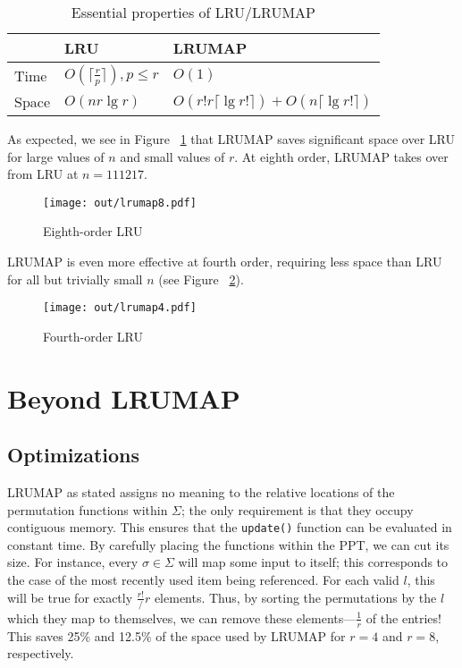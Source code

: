 \documentclass[10pt]{sigplanconf}
\begin{document}
\begin{table}[h]
\begin{center}
	\begin{tabular}{|l|l|l|}
	\hline
	& LRU & LRUMAP \\
	\hline
	Time & $O(\lceil\frac{r}{p}\rceil), {p}\le{r}$ & $O(1)$ \\
	\hline
	Space & $O(nr\lg{r})$ & $O(r!r\lceil\lg{r!}\rceil) + O(n\lceil\lg{r!}\rceil)$ \\
	\hline
	\end{tabular}
	\caption{Essential properties of LRU/LRUMAP}
\label{tab:lru}
\end{center}
\end{table}

As expected, we see in Figure ~\ref{fig:lru8} that LRUMAP saves significant space over LRU for large
values of $n$ and small values of $r$. At eighth order, LRUMAP takes over
from LRU at $n=111217$.

\begin{figure}[h]
\begin{center}
	\texttt{[image: out/lrumap8.pdf]}
	\caption{Eighth-order LRU}
\label{fig:lru8}
\end{center}
\end{figure}

LRUMAP is even more effective at fourth order, requiring less space than LRU
for all but trivially small $n$ (see Figure ~\ref{fig:lru4}).

\begin{figure}[h]
\begin{center}
	\texttt{[image: out/lrumap4.pdf]}
	\caption{Fourth-order LRU}
\label{fig:lru4}
\end{center}
\end{figure}

\section{Beyond LRUMAP}
\subsection{Optimizations}
LRUMAP as stated assigns no meaning to the relative locations of the permutation
functions within $\Sigma$; the only requirement is that they occupy contiguous
memory. This ensures that the \texttt{update()} function can be evaluated in
constant time. By carefully placing the functions within the PPT, we can cut its
size. For instance, every $\sigma\in\Sigma$ will map some input to itself; this
corresponds to the case of the most recently used item being referenced. For each
valid $l$, this will be true for exactly $\frac{r!}/r$ elements. Thus, by sorting
the permutations by the $l$ which they map to themselves, we can remove these
elements---$\frac{1}{r}$ of the entries! This saves 25\% and 12.5\% of the space
used by LRUMAP for $r=4$ and $r=8$, respectively.
\end{document}
